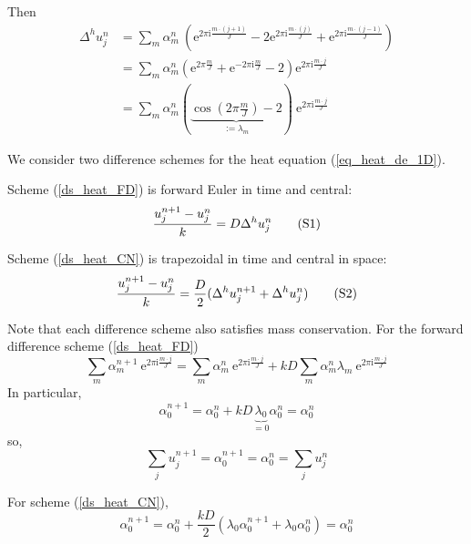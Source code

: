 \documentclass[12pt, reqno]{article}
\theoremstyle{definition}
\theoremstyle{remark}
\newcommand{\e}{\mathrm{e}}
\renewcommand{\i}{\mathrm{i}}
\begin{document}
Then
\begin{align*}
    \Delta^hu_j^n&=\sum_{m}\alpha_m^n~\left(\e^{2\pi\i\frac{m\cdot(j+1)}{J}}-2\e^{2\pi\i\frac{m\cdot(j)}{J}}+\e^{2\pi\i\frac{m\cdot(j-1)}{J}}\right)\\
    &=\sum_{m}\alpha_m^n\left( \e^{2\pi\frac{m}{J}}+\e^{-2\pi\i\frac{m}{J}}-2 \right)\e^{2\pi\i\frac{m\cdot j}{J}}\\
    &=\sum_m\alpha_m^n\left(\underbrace{\cos\left(2\pi\frac{m}{J}\right)-2}_{:=\lambda_m}\right)~\e^{2\pi\i\frac{m\cdot j}{J}}
\end{align*}

We consider two difference schemes for the heat equation (\ref{eq_heat_de_1D}).

Scheme (\ref{ds_heat_FD}) is forward Euler in time and central:
\begin{equation} \label{ds_heat_FD}
	\frac{u_j^{n+1}-u_j^n}{k}=D\Delta^hu_j^n{\tag{S1}}
\end{equation}

Scheme (\ref{ds_heat_CN}) is trapezoidal in time and central in space:
\begin{equation} \label{ds_heat_CN}
	\frac{u_j^{n+1}-u_j^n}{k}=\frac{D}{2}(\Delta^hu_j^{n+1}+\Delta^hu_j^n){\tag{S2}}
\end{equation}








Note that each difference scheme also satisfies mass conservation. For the forward difference scheme (\ref{ds_heat_FD})
\begin{equation*}
	\sum_m\alpha^{n+1}_m~\e^{2\pi\i\frac{m\cdot j}{J}}=\sum_{m}\alpha_m^n~\e^{2\pi\i\frac{m\cdot j}{J}}+kD\sum_{m}\alpha_m^n\lambda_m~\e^{2\pi\i\frac{m\cdot j}{J}}
\end{equation*}
In particular, 
\begin{equation*}
	\alpha_0^{n+1}=\alpha_0^n+kD\underbrace{\lambda_0}_{=0}\alpha_0^n=\alpha_0^n
\end{equation*}
so,
\begin{equation*}
	\sum_{j}u_j^{n+1}=\alpha_0^{n+1}=\alpha_0^{n}=\sum_ju_j^n
\end{equation*}

For scheme (\ref{ds_heat_CN}), 
\begin{equation*}
	\alpha_0^{n+1}=\alpha_0^n+\frac{kD}{2}(\lambda_0\alpha_0^{n+1}+\lambda_0\alpha_0^n)=\alpha_0^n
\end{equation*}
\end{document}
